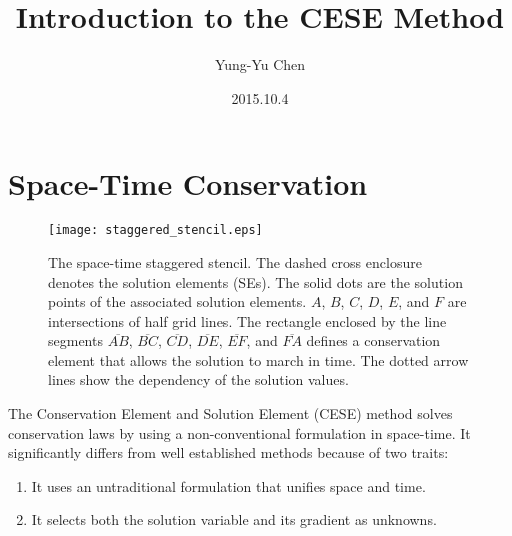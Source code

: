 \documentclass[a4paper,12pt,dvips]{article}
\begin{document}
\title{Introduction to the CESE Method}
\author{Yung-Yu Chen}
\date{2015.10.4}

\maketitle

\tableofcontents

\hspace{.5cm}

\section{Space-Time Conservation}

\begin{figure}[htbp]
\centering
\texttt{[image: staggered\_stencil.eps]}
\caption{The space-time staggered stencil.  The dashed cross enclosure denotes
the solution elements (SEs).  The solid dots are the solution points of the
associated solution elements.  $A$, $B$, $C$, $D$, $E$, and $F$ are
intersections of half grid lines.  The rectangle enclosed by the line segments
$\overline{AB}$, $\overline{BC}$, $\overline{CD}$, $\overline{DE}$,
$\overline{EF}$, and $\overline{FA}$ defines a conservation element that allows
the solution to march in time.  The dotted arrow lines show the dependency of
the solution values.}
\label{f:staggered_stencil}
\end{figure}

The Conservation Element and Solution Element (CESE) method\cite{b:chang95}
solves conservation laws by using a non-conventional formulation in space-time.
It significantly differs from well established methods because of two traits:
%
\begin{enumerate}
%
\item It uses an untraditional formulation that unifies space and time.
%
\item It selects both the solution variable and its gradient as unknowns.
%
\end{enumerate}
\end{document}
